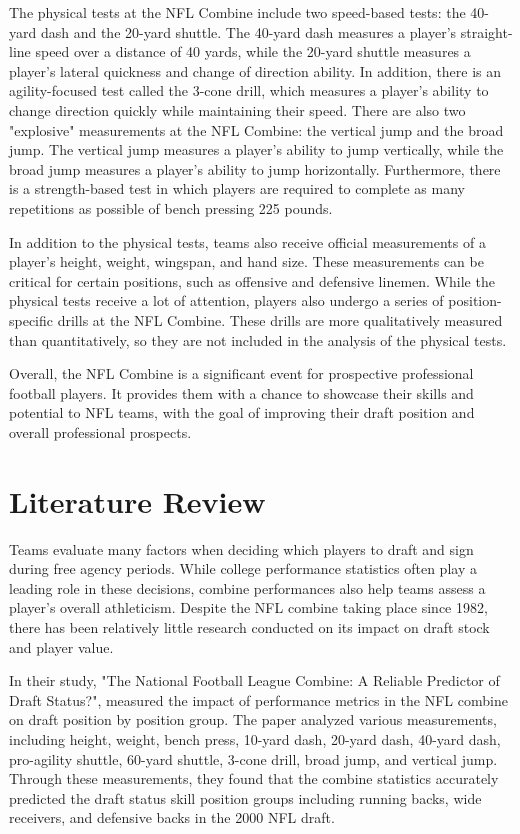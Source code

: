 \documentclass[12pt,english]{article}
\begin{document}
The physical tests at the NFL Combine include two speed-based tests: the 40-yard dash and the 20-yard shuttle. The 40-yard dash measures a player's straight-line speed over a distance of 40 yards, while the 20-yard shuttle measures a player's lateral quickness and change of direction ability. In addition, there is an agility-focused test called the 3-cone drill, which measures a player's ability to change direction quickly while maintaining their speed. There are also two "explosive" measurements at the NFL Combine: the vertical jump and the broad jump. The vertical jump measures a player's ability to jump vertically, while the broad jump measures a player's ability to jump horizontally. Furthermore, there is a strength-based test in which players are required to complete as many repetitions as possible of bench pressing 225 pounds.

In addition to the physical tests, teams also receive official measurements of a player's height, weight, wingspan, and hand size. These measurements can be critical for certain positions, such as offensive and defensive linemen. While the physical tests receive a lot of attention, players also undergo a series of position-specific drills at the NFL Combine. These drills are more qualitatively measured than quantitatively, so they are not included in the analysis of the physical tests. 

Overall, the NFL Combine is a significant event for prospective professional football players. It provides them with a chance to showcase their skills and potential to NFL teams, with the goal of improving their draft position and overall professional prospects. 

\section{Literature Review}\label{sec:litreview}
Teams evaluate many factors when deciding which players to draft and sign during free agency periods. While college performance statistics often play a leading role in these decisions, combine performances also help teams assess a player's overall athleticism. Despite the NFL combine taking place since 1982, there has been relatively little research conducted on its impact on draft stock and player value.

 In their study, "The National Football League Combine: A Reliable Predictor of Draft Status?", \citet{McGee2003TheNF} measured the impact of performance metrics in the NFL combine on draft position by position group. The paper analyzed various measurements, including height, weight, bench press, 10-yard dash, 20-yard dash, 40-yard dash, pro-agility shuttle, 60-yard shuttle, 3-cone drill, broad jump, and vertical jump. Through these measurements, they found that the combine statistics accurately predicted the draft status skill position groups including running backs, wide receivers, and defensive backs in the 2000 NFL draft. 
\end{document}

